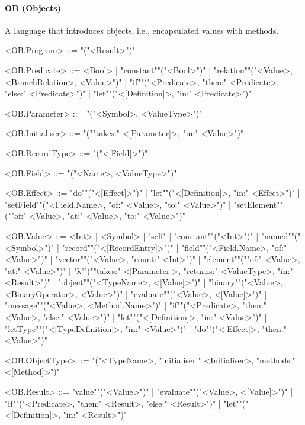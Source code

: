 \documentclass[main.tex]{subfiles}
\begin{document}
\paragraph{ OB (Objects) } A language that introduces objects, i.e., encapsulated values with methods.
\begin{grammar}
	\footnotesize
				<OB.Program> ::=
							"("<Result>")"
				\par
				<OB.Predicate> ::=
						<Bool> |
						"constant""("<Bool>")"
						| "relation""("<Value>, <BranchRelation>, <Value>")"
						| "if""("<Predicate>, "then:" <Predicate>, "else:" <Predicate>")"
						| "let""("<[Definition]>, "in:" <Predicate>")"
				\par
				<OB.Parameter> ::=
							"("<Symbol>, <ValueType>")"
				\par
				<OB.Initialiser> ::=
							"(""takes:" <[Parameter]>, "in:" <Value>")"
				\par
				<OB.RecordType> ::=
							"("<[Field]>")"
				\par
				<OB.Field> ::=
							"("<Name>, <ValueType>")"
				\par
				<OB.Effect> ::=
						"do""("<[Effect]>")"
						| "let""("<[Definition]>, "in:" <Effect>")"
						| "setField""("<Field.Name>, "of:" <Value>, "to:" <Value>")"
						| "setElement""(""of:" <Value>, "at:" <Value>, "to:" <Value>")"
				\par
				<OB.Value> ::=
						<Int> |
								<Symbol> |
						"self"
						| "constant""("<Int>")"
						| "named""("<Symbol>")"
						| "record""("<[RecordEntry]>")"
						| "field""("<Field.Name>, "of:" <Value>")"
						| "vector""("<Value>, "count:" <Int>")"
						| "element""(""of:" <Value>, "at:" <Value>")"
						| "λ""(""takes:" <[Parameter]>, "returns:" <ValueType>, "in:" <Result>")"
						| "object""("<TypeName>, <[Value]>")"
						| "binary""("<Value>, <BinaryOperator>, <Value>")"
						| "evaluate""("<Value>, <[Value]>")"
						| "message""("<Value>, <Method.Name>")"
						| "if""("<Predicate>, "then:" <Value>, "else:" <Value>")"
						| "let""("<[Definition]>, "in:" <Value>")"
						| "letType""("<[TypeDefinition]>, "in:" <Value>")"
						| "do""("<[Effect]>, "then:" <Value>")"
				\par
				<OB.ObjectType> ::=
							"("<TypeName>, "initialiser:" <Initialiser>, "methods:" <[Method]>")"
				\par
				<OB.Result> ::=
						"value""("<Value>")"
						| "evaluate""("<Value>, <[Value]>")"
						| "if""("<Predicate>, "then:" <Result>, "else:" <Result>")"
						| "let""("<[Definition]>, "in:" <Result>")"

\end{grammar}
\end{document}
